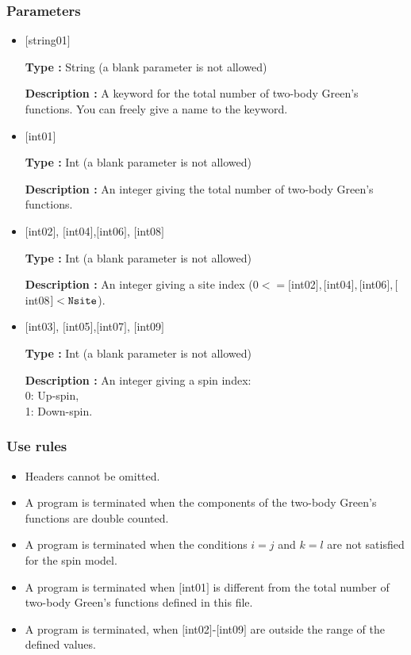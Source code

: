\subsubsection{Parameters}
 \begin{itemize}
    \item  $[$string01$]$
   
    {\bf Type :} String (a blank parameter is not allowed)

   {\bf Description :} A keyword for the total number of two-body Green's functions. You can freely give a name to the keyword.

   \item  $[$int01$]$
   
    {\bf Type :} Int (a blank parameter is not allowed)

   {\bf Description :}  An integer giving the total number of two-body Green's functions.


  \item  $[$int02$]$, $[$int04$]$,$[$int06$]$, $[$int08$]$

 {\bf Type :} Int (a blank parameter is not allowed)

{\bf Description :} An integer giving a site index ($0<= [$int02$], [$int04$], [$int06$], [$int08$]<\verb|Nsite|$).
 
  \item  $[$int03$]$, $[$int05$]$,$[$int07$]$, $[$int09$]$

 {\bf Type :} Int (a blank parameter is not allowed)

{\bf Description :} 
An integer giving a spin index:\\
0: Up-spin,\\
1: Down-spin.

\end{itemize}

\subsubsection{Use rules}
\begin{itemize}
\item Headers cannot be omitted. 
\item A program is terminated when the components of the two-body Green's functions are double counted.
\item {A program is terminated when the conditions $i=j$ and $k=l$ are not satisfied for the spin model.}
\item A program is terminated when $[$int01$]$ is different from the total number of two-body Green's functions defined in this file.
\item A program is terminated, when $[$int02$]$-$[$int09$]$ are outside the range of the defined values.
\end{itemize}

